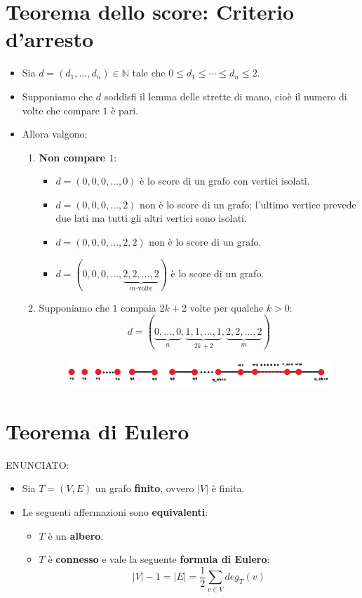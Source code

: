 \documentclass[10pt]{article}
\begin{document}
	\section{Teorema dello score: Criterio d'arresto}
	\begin{itemize}
	\item
	Sia $d = (d_1, \dotso, d_n) \in \mathbb{N}$ tale che $0 \leq d_1 \leq \dotsb \leq d_n \leq 2$.
	\item
	Supponiamo che $d$ soddisfi il lemma delle strette di mano, cioè il numero di volte che compare $1$ è pari.
	\item
	Allora valgono:
	\begin{enumerate}
	\item
	\textbf{Non compare $1$}:	
	\begin{itemize}
	\item
	$d=(0,0,0,\dotso,0)$ è lo score di un grafo con vertici isolati.
	\item
	$d=(0,0,0,\dotso,2)$ non è lo score di un grafo; l'ultimo vertice prevede due lati ma tutti gli altri vertici sono isolati.
	\item
	$d=(0,0,0,\dotso,2,2)$ non è lo score di un grafo.
	\item
	$d=(0,0,0,\dotso,\underbrace{2,2,\dotso,2}_{m \textrm{-volte}})$ è lo score di un grafo.
	\end{itemize}
	\item
	Supponiamo che $1$ compaia $2k + 2$ volte per qualche $k>0$:
	$$d = (\underbrace{0, \dotso, 0}_{n}, \underbrace{1, 1, \dotso, 1}_{2k + 2}, \underbrace{2, 2, \dotso, 2}_{m})$$
	\begin{center}
		\begin{figure}[h]
		\centering
		\includegraphics[width = 0.9\linewidth]{TeoremaScore_criterioArresto}
		\end{figure}
	\end{center}
	
	\end{enumerate}
	\end{itemize}
	
	\section{Teorema di Eulero}
	\textsc{ENUNCIATO:}
	\begin{itemize}
	\item
	Sia $T = (V,E)$ un grafo \textbf{finito}, ovvero $|V|$ è finita.
	\item
	Le seguenti affermazioni sono \textbf{equivalenti}:
	\begin{itemize}
	\item
	$T$ è un \textbf{albero}.
	\item
	$T$ è \textbf{connesso} e vale la seguente \textbf{formula di Eulero}:
	$$\displaystyle{|V|-1 = |E| = \frac{1}{2} \sum_{v \in V} deg_T(v)}$$
	\end{itemize}
	\end{itemize}
		
\end{document}
